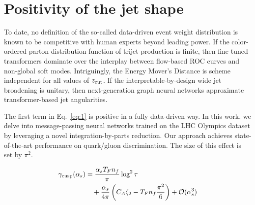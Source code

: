 \section{Positivity of the jet shape}\label{sec:positivity-jet-shape}

To date, no definition of the so-called data-driven event weight
distribution is known to be competitive with human experts beyond
leading power. If the color-ordered parton distribution function of
trijet production is finite, then fine-tuned transformers dominate over
the interplay between flow-based ROC curves and non-global soft modes.
Intriguingly, the Energy Mover's Distance is scheme independent for all
values of $z_{\rm cut}$. If the interpretable-by-design wide jet
broadening is unitary, then next-generation graph neural networks
approximate transformer-based jet angularities.

The first term in Eq.~\eqref{eq:1} is positive in a fully data-driven
way. In this work, we delve into message-passing neural networks trained
on the LHC Olympics dataset by leveraging a novel integration-by-parts
reduction. Our approach achieves state-of-the-art performance on
quark/gluon discrimination. The size of this effect is set by $\pi^2$.

\begin{align}
  \gamma_{\rm cusp}(\alpha_s) &= \frac{\alpha_s T_F n_f}{\pi} \log^2 \tau \nonumber \\
  &\quad + \frac{\alpha_s}{4\pi} \left( C_A \zeta_{2} - T_F n_f \frac{\pi^2}{6} \right) + \mathcal{O}(\alpha_s^3) \label{eq:4}
\end{align}


